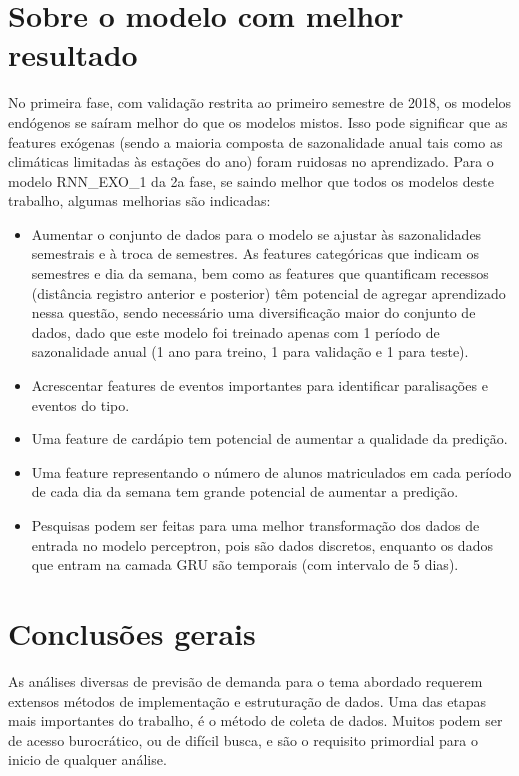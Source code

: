    \section{Sobre o modelo com melhor resultado}
        No primeira fase, com validação restrita ao primeiro semestre de 2018, os modelos endógenos se saíram melhor do que os modelos mistos. Isso pode significar que as features exógenas (sendo a maioria composta de sazonalidade anual tais como as climáticas limitadas às estações do ano) foram ruidosas no aprendizado.
        Para o modelo RNN\_EXO\_1 da 2a fase, se saindo melhor que todos os modelos deste trabalho, algumas melhorias são indicadas:
        \begin{itemize}
            \item Aumentar o conjunto de dados para o modelo se ajustar às sazonalidades semestrais e à troca de semestres. As features categóricas que indicam os semestres e dia da semana, bem como as features que quantificam recessos (distância registro anterior e posterior) têm potencial de agregar aprendizado nessa questão, sendo necessário uma diversificação maior do conjunto de dados, dado que este modelo foi treinado apenas com 1 período de sazonalidade anual (1 ano para treino, 1 para validação e 1 para teste).
            \item Acrescentar features de eventos importantes para identificar paralisações e eventos do tipo.
            \item Uma feature de cardápio tem potencial de aumentar a qualidade da predição.
            \item Uma feature representando o número de alunos matriculados em cada período de cada dia da semana tem grande potencial de aumentar a predição.
            \item Pesquisas podem ser feitas para uma melhor transformação dos dados de entrada no modelo perceptron, pois são dados discretos, enquanto os dados que entram na camada GRU são temporais (com intervalo de 5 dias).
        \end{itemize}
        
    \section{Conclusões gerais}
         As análises diversas de previsão de demanda para o tema abordado requerem extensos métodos de implementação e estruturação de dados.
        Uma das etapas mais importantes do trabalho, é o método de coleta de dados. Muitos podem ser de acesso burocrático, ou de difícil busca, e são o requisito primordial para o inicio de qualquer análise.
        
